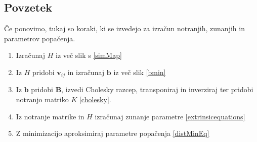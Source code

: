 \subsection{Povzetek}
Če ponovimo, tukaj so koraki, ki se izvedejo za izračun notranjih, zunanjih in parametrov popačenja.
\begin{enumerate}
    \item Izračunaj $H$ iz več slik s \ref{simMap}
    \item Iz $H$ pridobi $\pmb{v}_{ij}$ in izračunaj $\pmb{b}$ iz več slik \ref{bmin}
    \item Iz $\pmb{b}$ pridobi $\pmb{B}$, izvedi Cholesky razcep, transponiraj in inverziraj ter pridobi notranjo matriko $K$ \ref{cholesky}.
    \item Iz notranje matrike in $H$ izračunaj zunanje parametre \ref{extrinsicequations}
    \item Z minimizacijo aproksimiraj parametre popačenja \ref{distMinEq}
\end{enumerate}